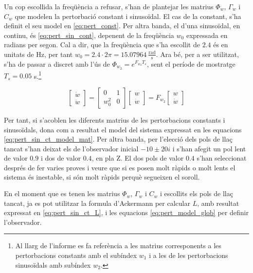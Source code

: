 \documentclass[12pt,a4paper,final,twoside,openright]{report}
\begin{document}
\vspace{100pt}
Un cop escollida la freqüència a refusar, s'han de plantejar les matrius $\Phi_w$, $\Gamma_w$ i $C_w$ que modelen la pertorbació constant i sinusoïdal. El cas de la constant, s'ha definit el seu model en \eqref{eq:pert_const}. Per altra banda, el d'una sinusoïdal, en continu, és \eqref{eq:pert_sin_cont}, depenent de la freqüència $w_0$ expressada en radians per segon. Cal a dir, que la freqüència que s'ha escollit de $2.4$ és en unitats de Hz, per tant $w_0=2.4\cdot2\pi = 15.07964~\mathrm{\frac{rad}{s}}$. Ara bé, per a ser utilitzat, s'ha de passar a discret amb l'ús de $\Phi_{w_2}=e^{F_{w_2} T_s}$, sent el període de mostratge $T_s=0.05$ s.\footnote{Al llarg de l'informe es fa referència a les matrius corresponents a les pertorbacions constants amb el subíndex $w_1$ i a les de les pertorbacions sinusoïdals amb subíndex $w_2$.}

\begin{equation}\label{eq:pert_sin_cont}
\begin{bmatrix}
\dot{w}\\
\ddot{w}
\end{bmatrix} = \begin{bmatrix}
0 & 1\\
w_0^2 & 0
\end{bmatrix} \begin{bmatrix}
w\\
\dot{w}
\end{bmatrix} = F_{w_2} \begin{bmatrix}
w\\
\dot{w}
\end{bmatrix}
\end{equation}

Per tant, si s'acoblen les diferents matrius de les pertorbacions constants i sinusoïdals, dona com a resultat el model del sistema expressat en les equacions \eqref{eq:pert_sin_ct_model_mat}. Per altra banda, per l'elecció dels pols de llaç tancat s'han deixat els de l'observador inicial $-10\pm20i$ i s'han afegit un pol lent de valor $0.9$ i dos de valor $0.4$, en pla Z. El dos pols de valor $0.4$ s'han seleccionat després de fer varies proves i veure que si es posen molt ràpids o molt lents el sistema és inestable, si són molt ràpids perquè segueixen el soroll.

En el moment que es tenen les matrius $\Phi_w$, $\Gamma_w$ i $C_w$ i escollits els pols de llaç tancat, ja es pot utilitzar la formula d'Ackermann per calcular $L$, amb resultat expressat en \eqref{eq:pert_sin_ct_L}, i les equacions \eqref{eq:pert_model_glob} per definir l'observador.
\end{document}
